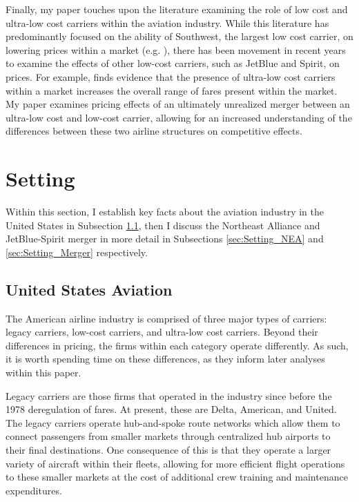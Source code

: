 \documentclass{article}
\let\Oldsubsection\subsection
\renewcommand{\subsection}{\FloatBarrier\Oldsubsection}
\begin{document}
	Finally, my paper touches upon the literature examining the role of low cost and ultra-low cost carriers within the aviation industry. While this literature has predominantly focused on the ability of Southwest, the largest low cost carrier, on lowering prices within a market (e.g. \citet{windle_short_1995, morrison_actual_2001,  goolsbee_how_2008}), there has been movement in recent years to examine the effects of other low-cost carriers, such as JetBlue and Spirit, on prices. For example, \citet{shrago_spirit_2024} finds evidence that the presence of ultra-low cost carriers within a market increases the overall range of fares present within the market. My paper examines pricing effects of an ultimately unrealized merger between an ultra-low cost and low-cost carrier, allowing for an increased understanding of the differences between these two airline structures on competitive effects.  
	
	\section{Setting}
	\label{sec:Setting}
	
	Within this section, I establish key facts about the aviation industry in the United States in Subsection \ref{sec:Setting_Aviation}, then I discuss the Northeast Alliance and JetBlue-Spirit merger in more detail in Subsections \ref{sec:Setting_NEA} and \ref{sec:Setting_Merger} respectively.
	
	\subsection{United States Aviation}
	\label{sec:Setting_Aviation}
	The American airline industry is comprised of three major types of carriers: legacy carriers, low-cost carriers, and ultra-low cost carriers. Beyond their differences in pricing, the firms within each category operate differently. As such, it is worth spending time on these differences, as they inform later analyses within this paper.
	
	Legacy carriers are those firms that operated in the industry since before the 1978 deregulation of fares. At present, these are Delta, American, and United. The legacy carriers operate hub-and-spoke route networks which allow them to connect passengers from smaller markets through centralized hub airports to their final destinations. One consequence of this is that they operate a larger variety of aircraft within their fleets, allowing for more efficient flight operations to these smaller markets at the cost of additional crew training and maintenance expenditures.   
	
\end{document}
